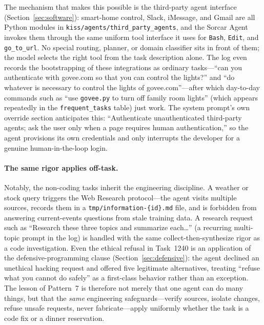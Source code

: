\documentclass{article}
\begin{document}
The mechanism that makes this possible is the third-party agent
interface (Section~\ref{sec:software}): smart-home control, Slack,
iMessage, and Gmail are all Python modules in
\texttt{kiss/agents/third\_party\_agents}, and the Sorcar Agent
invokes them through the same uniform tool interface it uses for
\texttt{Bash}, \texttt{Edit}, and \texttt{go\_to\_url}.
No special routing, planner, or domain classifier sits in front of
them; the model selects the right tool from the task description
alone.
The log even records the bootstrapping of these integrations as
ordinary tasks---``can you authenticate with govee.com so that you
can control the lights?'' and ``do whatever is necessary to control
the lights of govee.com''---after which day-to-day commands such as
``use \texttt{govee.py} to turn off family room lights'' (which
appears repeatedly in the \texttt{frequent\_tasks} table) just work.
The system prompt's own override section anticipates this:
``Authenticate unauthenticated third-party agents; ask the user only
when a page requires human authentication,'' so the agent provisions
its own credentials and only interrupts the developer for a genuine
human-in-the-loop login.

\paragraph{The same rigor applies off-task.}
Notably, the non-coding tasks inherit the engineering discipline.
A weather or stock query triggers the Web Research protocol---the
agent visits multiple sources, records them in a
\texttt{tmp/information-\{id\}.md} file, and is forbidden from
answering current-events questions from stale training data.
A research request such as ``Research these three topics and
summarize each\ldots'' (a recurring multi-topic prompt in the log) is
handled with the same collect-then-synthesize rigor as a code
investigation.
Even the ethical refusal in Task~1240 is an application of the
defensive-programming clause (Section~\ref{sec:defensive}): the agent
declined an unethical hacking request and offered five legitimate
alternatives, treating ``refuse what you cannot do safely'' as a
first-class behavior rather than an exception.
The lesson of Pattern~7 is therefore not merely that one agent can do
many things, but that the \emph{same} engineering safeguards---verify
sources, isolate changes, refuse unsafe requests, never fabricate---apply
uniformly whether the task is a code fix or a dinner reservation.

\end{document}
